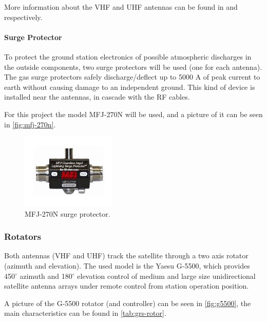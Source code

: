 More information about the VHF and UHF antennas can be found in \cite{2mcp14} and \cite{a719b} respectively.

\paragraph{Surge Protector}

To protect the ground station electronics of possible atmospheric discharges in the outside components, two surge protectors will be used (one for each antenna). The gas surge protectors safely discharge/deflect up to 5000 A of peak current to earth without causing damage to an independent ground. This kind of device is installed near the antennas, in cascade with the RF cables.

For this project the model MFJ-270N will be used, and a picture of it can be seen in \autoref{fig:mfj-270n}.

\begin{figure}[!ht]
    \begin{center}
        \includegraphics[width=0.4\textwidth]{figures/mfj-270n.jpeg}
        \caption{MFJ-270N surge protector.}
        \label{fig:mfj-270n}
    \end{center}
\end{figure}

\subsubsection{Rotators}

Both antennas (VHF and UHF) track the satellite through a two axis rotator (azimuth and elevation). The used model is the Yaesu G-5500, which provides 450$^{\circ}$ azimuth and 180$^{\circ}$ elevation control of medium and large size unidirectional satellite antenna arrays under remote control from station operation position.

A picture of the G-5500 rotator (and controller) can be seen in \autoref{fig:g5500}, the main characteristics can be found in \autoref{tab:grs-rotor}.

